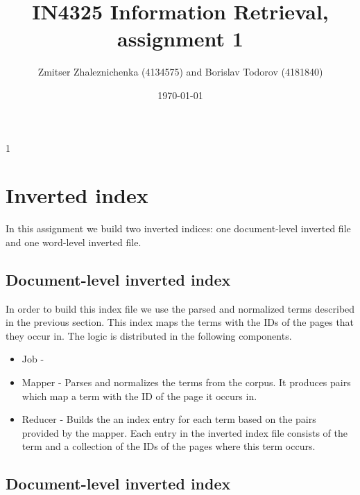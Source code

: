 \documentclass[a4paper, notitlepage]{report}
\begin{document}
\title{IN4325 Information Retrieval, assignment 1}
\author{Zmitser Zhaleznichenka (4134575) and Borislav Todorov (4181840)}
\date{\today}
\maketitle

\begin{description}
\item[1] \hfill

\end{description}

\section{Inverted index}
In this assignment we build two inverted indices: one document-level inverted file and one word-level inverted file.

\subsection{Document-level inverted index}
In order to build this index file we use the parsed and normalized terms described in the previous section. This index maps the terms with the IDs of the pages that they occur in. The logic is distributed in the following components.

\begin{itemize}
	\item Job - 
	\item Mapper - Parses and normalizes the terms from the corpus. It produces pairs which map a term with the ID of the page it occurs in.
	\item Reducer - Builds the an index entry for each term based on the pairs provided by the mapper. Each entry in the inverted index file consists of the term and a collection of the IDs of the pages where this term occurs.  
\end{itemize}

\subsection{Document-level inverted index}
\end{document}
